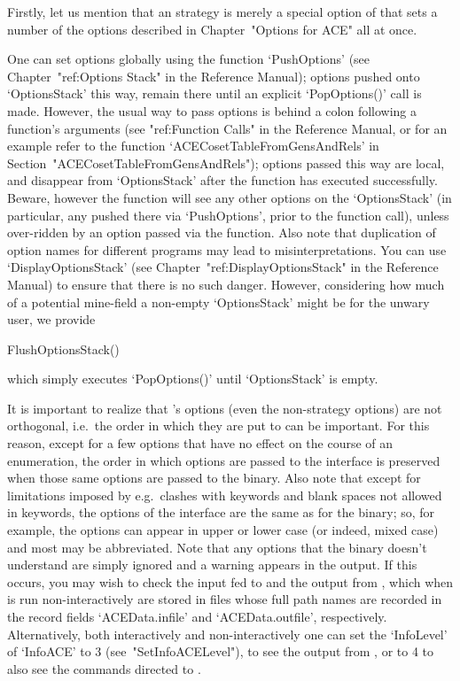 Firstly, let us mention that an {\ACE} strategy is  merely  a  special
option of {\ACE} that sets  a  number  of  the  options  described  in
Chapter~"Options for ACE" all at once.

\beginitems

One can set options globally using  the  function  `PushOptions'  (see
Chapter~"ref:Options Stack" in the {\GAP} Reference  Manual);  options
pushed onto `OptionsStack' this way, remain there  until  an  explicit
`PopOptions()' call is made. However, the usual way to pass options is
behind a colon following a  function's  arguments  (see  "ref:Function
Calls" in the {\GAP} Reference Manual, or for an example refer to  the
function               `ACECosetTableFromGensAndRels'               in
Section~"ACECosetTableFromGensAndRels"); options passed this  way  are
local, and  disappear  from  `OptionsStack'  after  the  function  has
executed successfully. Beware, however the function will see any other
options on the `OptionsStack' (in particular,  any  pushed  there  via
`PushOptions', prior to the function call), unless over-ridden  by  an
option passed via the function. Also note that duplication  of  option
names for different programs may lead to misinterpretations.  You  can
use `DisplayOptionsStack'  (see  Chapter~"ref:DisplayOptionsStack"  in
the {\GAP} Reference Manual) to ensure that there is no  such  danger.
However, considering how much of a potential  mine-field  a  non-empty
`OptionsStack' might be for the unwary user, we provide

\>FlushOptionsStack()

which simply executes `PopOptions()' until `OptionsStack' is empty.

\enditems

It  is  important  to  realize  that  {\ACE}'s   options   (even   the
non-strategy options) are not orthogonal, i.e.\  the  order  in  which
they are put to {\ACE} can be important. For this reason, except for a
few options that have no effect on the course of an  enumeration,  the
order in which options are passed to the {\ACE} interface is preserved
when those same options are passed to the  {\ACE}  binary.  Also  note
that except for limitations  imposed  by  {\GAP}  e.g.\  clashes  with
{\GAP} keywords and blank spaces not allowed in keywords, the  options
of the {\ACE} interface are the  same  as  for  the  binary;  so,  for
example, the options can appear in upper or  lower  case  (or  indeed,
mixed case) and most may be abbreviated. Note that  any  options  that
the {\ACE} binary doesn't understand are simply ignored and a  warning
appears in the {\ACE} output. If this occurs, you may  wish  to  check
the input fed to {\ACE} and the output from {\ACE}, which when  {\ACE}
is run non-interactively are stored in files whose full path names are
recorded in the record fields `ACEData.infile' and  `ACEData.outfile',
respectively. Alternatively, both interactively and  non-interactively
one can set the `InfoLevel' of `InfoACE' to 3 (see~"SetInfoACELevel"),
to see the output from {\ACE}, or  to  4  to  also  see  the  commands
directed to {\ACE}.

